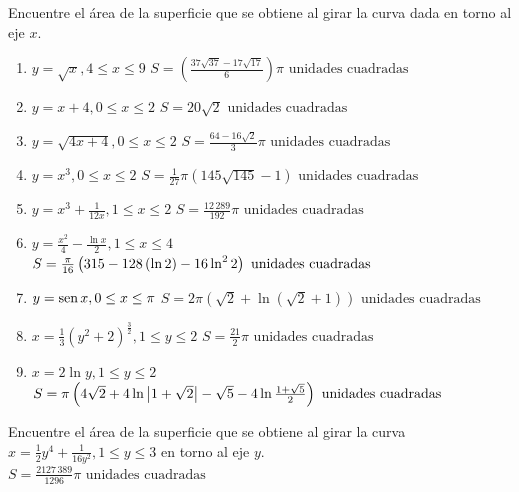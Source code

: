 \begin{ejer}{Encuentre el área de la superficie que se obtiene al girar la curva dada en torno al eje $x$.}
\end{ejer}
{\small
\begin{enumerate}
	
\item {$y=\sqrt{x},4\leq x\leq 9$} {$S=\left( \frac{37\sqrt{37}%
-17\sqrt{17}}{6}\right) \pi \text{ unidades cuadradas}$}

\item {$y=x+4,0\leq x\leq 2$} {$ S=20\sqrt{2}\text{ unidades cuadradas}$}

\item {$y=\sqrt{4x+4},0\leq x\leq 2$} {$S= \frac{64-16\sqrt{2} }{3}\pi\text{ unidades cuadradas}$}

\item {$y=x^{3},0\leq x\leq 2$} {$S=\frac{1}{27}\pi \left( 145\sqrt{145}-1\right) \text{ unidades cuadradas}$}

\item {$y=x^{3}+\frac{1}{12x},1\leq x\leq 2$
} {$S= \frac{12\,289}{192}\pi \text{ unidades cuadradas}$}

\item {$y=\frac{x^{2}}{4}-\frac{\ln x}{2},1\leq x\leq 4$} {$S=\frac{\pi }{16}\left( 315-128\left( \ln 2\right) -16\ln ^{2}2\right) \\
\text{ unidades cuadradas} $ }

\item {$y=\text{\rm sen}\, x,0\leq x\leq \pi $} {$S=2\pi \left( \sqrt{2}+\ln \left( \sqrt{2}+1\right) \right) \text{ unidades cuadradas}$}

\item {$x=\frac{1}{3}(y^{2}+2)^{\frac{3}{2}},1\leq y\leq 2$} { $S= \frac{21}{2}\pi \text{ unidades cuadradas}$}

\item {$x=2\ln y,1\leq y\leq 2$} {$S=\pi \left( 4\sqrt{2}+4\ln \left\vert 1+\sqrt{2}\right\vert -\sqrt{5}-4\ln 
\frac{1+\sqrt{5}}{2}\right) \\
\text{ unidades cuadradas}$}
\end{enumerate}
}



\begin{ejer}{Encuentre el área de la superficie que se obtiene al girar la curva 
$x=\frac{1}{2}y^{4}+\frac{1}{16y^{2}},1\leq y\leq 3$
en torno al eje $y$.} \\ {$S=\frac{2127\,389}{1296}\pi \text{ unidades cuadradas}$}
\end{ejer}



